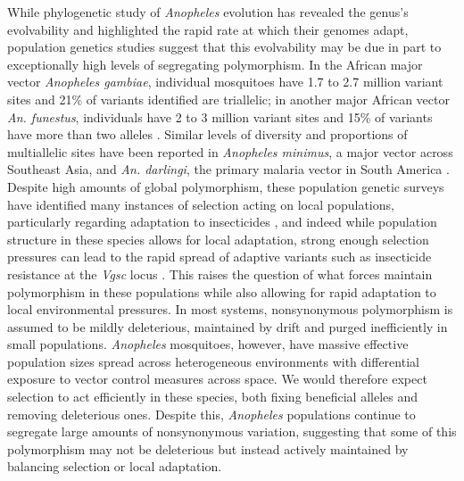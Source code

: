 While phylogenetic study of \textit{Anopheles} evolution has revealed the genus's evolvability
and highlighted the rapid rate at which their genomes adapt,
population genetics studies suggest that this evolvability may be due in part
to exceptionally high levels of segregating polymorphism.
In the African major vector \textit{Anopheles gambiae},
individual mosquitoes have 1.7 to 2.7 million variant sites
and 21\% of variants identified are triallelic;
in another major African vector \textit{An. funestus},
individuals have 2 to 3 million variant sites
and 15\% of variants have more than two alleles \citep{gambiae, funestus}.
Similar levels of diversity and proportions of multiallelic sites
have been reported in \textit{Anopheles minimus}, a major vector across Southeast Asia,
and \textit{An. darlingi}, the primary malaria vector in South America \citep{darlingi, minimus}.
Despite high amounts of global polymorphism,
these population genetic surveys have identified many instances of selection
acting on local populations,
particularly regarding adaptation to insecticides
\citep{Xue_Schrider_Kern_2021, Clarkson_Miles_Harding_2021, Barnes_Weedall_Ndula_2017},
and indeed while population structure in these species allows for local adaptation,
strong enough selection pressures can lead to the rapid spread of adaptive variants
such as insecticide resistance at the \textit{Vgsc} locus \citep{gambiae}.
This raises the question of what forces maintain polymorphism in these populations
while also allowing for rapid adaptation to local environmental pressures.
In most systems, nonsynonymous polymorphism is assumed to be mildly deleterious,
maintained by drift and purged inefficiently in small populations.
\textit{Anopheles} mosquitoes, however, have massive effective population sizes
spread across heterogeneous environments
with differential exposure to vector control measures across space.
We would therefore expect selection to act efficiently in these species,
both fixing beneficial alleles and removing deleterious ones.
Despite this, \textit{Anopheles} populations continue to segregate large amounts of nonsynonymous variation,
suggesting that some of this polymorphism may not be deleterious
but instead actively maintained by balancing selection or local adaptation.

